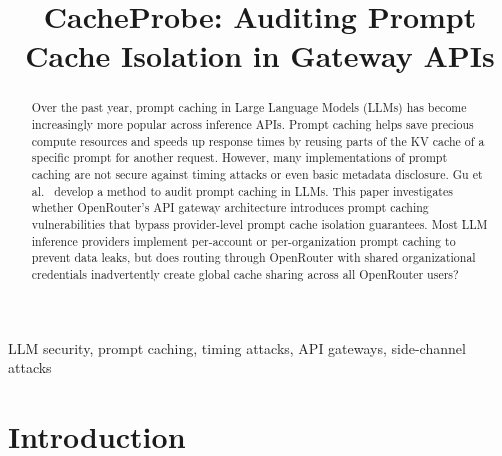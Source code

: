 \documentclass[conference]{IEEEtran}
\begin{document}
\title{CacheProbe: Auditing Prompt Cache Isolation in Gateway APIs}

\author{
}

\maketitle

\begin{abstract}
    Over the past year, prompt caching in Large Language Models (LLMs) has become increasingly more popular across inference APIs.
    Prompt caching helps save precious compute resources and speeds up response times by reusing parts of the KV cache of a specific prompt for another request.
    However, many implementations of prompt caching are not secure against timing attacks or even basic metadata disclosure.
    Gu et al.~\cite{DBLP:conf/icml/GuLKLH25} develop a method to audit prompt caching in LLMs.
    This paper investigates whether OpenRouter's API gateway architecture introduces prompt caching vulnerabilities that bypass provider-level prompt cache isolation guarantees.
    Most LLM inference providers implement per-account or per-organization prompt caching to prevent data leaks, but does routing through OpenRouter with shared organizational credentials inadvertently create global cache sharing across all OpenRouter users?
\end{abstract}

\begin{IEEEkeywords}
    LLM security, prompt caching, timing attacks, API gateways, side-channel attacks
\end{IEEEkeywords}

\section{Introduction}
\label{sec:introduction}
\end{document}
